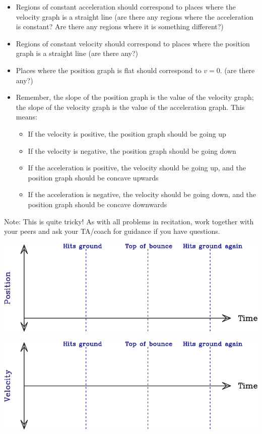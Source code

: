 \documentclass[12pt]{article}
\newcommand{\BI}{\begin{itemize}}
\newcommand{\EI}{\end{itemize}}
\begin{document}
\begin{enumerate}
\BI
    \item Regions of constant acceleration should correspond to places where the velocity graph is a straight line (are there any regions where the acceleration is constant? Are there any regions where it is something different?)
    \item Regions of constant velocity should correspond to places where the position graph is a straight line (are there any?)
    \item Places where the position graph is flat should correspond to $v=0$. (are there any?)
    \item Remember, the slope of the position graph is the value of the velocity graph; the slope of the velocity graph is the value of the acceleration graph. This means:
    \begin{itemize}
    	\item If the velocity is positive, the position graph should be going up
    	\item If the velocity is negative, the position graph should be going down
    	\item If the acceleration is positive, the velocity should be going up, and the position graph should be concave upwards
    	\item If the acceleration is negative, the velocity should be going down, and the position graph should be concave downwards
    \end{itemize}
\EI
     

Note: This is quite tricky! As with all problems in recitation, work together with your peers and ask your TA/coach for guidance if you have questions.



\newpage
\begin{center}
	\includegraphics[width=\textwidth]{position-crop.pdf}
	
	\vspace{0.4in}
	
	\includegraphics[width=\textwidth]{velocity-crop.pdf}
	

\end{center}
\end{enumerate}
\end{document}
